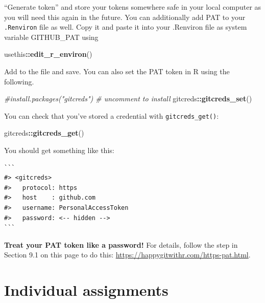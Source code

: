 \documentclass[
]{book}
\newenvironment{Shaded}{\begin{snugshade}}{\end{snugshade}}
\newcommand{\CommentTok}[1]{\textcolor[rgb]{0.56,0.35,0.01}{\textit{#1}}}
\newcommand{\FunctionTok}[1]{\textcolor[rgb]{0.13,0.29,0.53}{\textbf{#1}}}
\newcommand{\NormalTok}[1]{#1}
\newcommand{\SpecialCharTok}[1]{\textcolor[rgb]{0.81,0.36,0.00}{\textbf{#1}}}
\begin{document}
\begin{enumerate}
  ``Generate token'' and store your tokens somewhere safe in your local computer as you will need this again in the future. You can additionally add PAT to your \texttt{.Renviron} file as well. Copy it and paste it into your .Renviron file as system variable GITHUB\_PAT using

\begin{Shaded}
\begin{Highlighting}[]
\NormalTok{usethis}\SpecialCharTok{::}\FunctionTok{edit\_r\_environ}\NormalTok{()}
\end{Highlighting}
\end{Shaded}

  Add to the file and save. You can also set the PAT token in R using the following.

\begin{Shaded}
\begin{Highlighting}[]
\CommentTok{\#install.packages("gitcreds") \# uncomment to install}
\NormalTok{gitcreds}\SpecialCharTok{::}\FunctionTok{gitcreds\_set}\NormalTok{()}
\end{Highlighting}
\end{Shaded}

  You can check that you've stored a credential with \texttt{gitcreds\_get()}:

\begin{Shaded}
\begin{Highlighting}[]
\NormalTok{gitcreds}\SpecialCharTok{::}\FunctionTok{gitcreds\_get}\NormalTok{()}
\end{Highlighting}
\end{Shaded}
\end{enumerate}

You should get something like this:

\begin{verbatim}
```
#> <gitcreds>
#>   protocol: https
#>   host    : github.com
#>   username: PersonalAccessToken
#>   password: <-- hidden -->
```
\end{verbatim}

\textbf{Treat your PAT token like a password!} For details, follow the step in Section 9.1 on this page to do this: \url{https://happygitwithr.com/https-pat.html}.

\hypertarget{individual-assignments}{%
\section{Individual assignments}\label{individual-assignments}}
\end{document}

